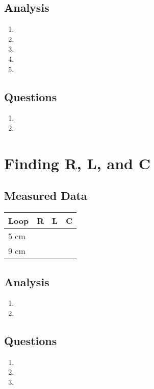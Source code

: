 \documentclass{article}
\begin{document}
\subsection{Analysis}
\begin{enumerate}
	\item 
	\item 
	\item 
	\item 
	\item 
\end{enumerate}

\subsection{Questions}
\begin{enumerate}
	\item 
	\item 
\end{enumerate}


\section{Finding R, L, and C}

\subsection{Measured Data}
\begin{table}[H]
\centering
\begin{tabular}{|l|l|l|l|}
\hline
Loop & R & L & C \\ \hline
5 cm &   &   &  \\ \hline
9 cm &   &   &  \\ \hline
\end{tabular}
\end{table}

\subsection{Analysis}

\begin{enumerate}
	\item
	\item
\end{enumerate}

\subsection{Questions}

\begin{enumerate}
	\item 
	\item 
	\item 
\end{enumerate}

\end{document}

